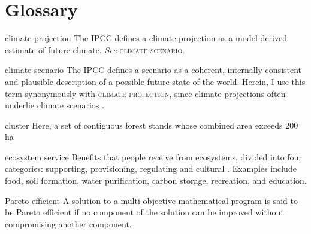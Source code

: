 
\chapter*{Glossary}      %
\thispagestyle{plain}
%
\begin{glossary}

\item[climate projection] The IPCC defines a climate projection as a model-derived estimate of future climate. \textit{See} \textsc{climate scenario}\cite{ipcc2013Definition}.

\item[climate scenario] The IPCC defines a scenario as a coherent, internally consistent and plausible description of a possible future state of the world. Herein, I use this term synonymously with \textsc{climate projection}, since climate projections often underlie climate scenarios \cite{ipcc2013Definition}.

\item[cluster] Here, a set of contiguous forest stands whose combined area exceeds 200 ha

\item[ecosystem service] Benefits that people receive from ecosystems, divided into four categories: supporting, provisioning, regulating and cultural \cite{assessment2005ecosystems}. Examples include food, soil formation, water purification, carbon storage, recreation, and education.

\item[Pareto efficient] A solution to a multi-objective mathematical program is said to be Pareto efficient if no component of the solution can be improved without compromising another component.
 
\end{glossary}